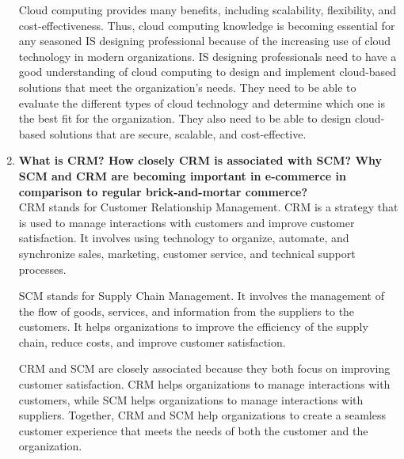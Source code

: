 \documentclass[12pt]{article}
\begin{document}
\begin{enumerate}
    Cloud computing provides many benefits, including scalability, flexibility, and cost-effectiveness. Thus, cloud computing knowledge is becoming essential for any seasoned IS designing professional because of the increasing use of cloud technology in modern organizations. IS designing professionals need to have a good understanding of cloud computing to design and implement cloud-based solutions that meet the organization's needs. They need to be able to evaluate the different types of cloud technology and determine which one is the best fit for the organization. They also need to be able to design cloud-based solutions that are secure, scalable, and cost-effective.
    \item {\bfseries What is CRM? How closely CRM is associated with SCM? Why SCM and CRM are becoming important in e-commerce in comparison to regular brick-and-mortar commerce?\\}
    CRM stands for Customer Relationship Management. CRM is a strategy that is used to manage interactions with customers and improve customer satisfaction. It involves using technology to organize, automate, and synchronize sales, marketing, customer service, and technical support processes.
    
    SCM stands for Supply Chain Management. It involves the management of the flow of goods, services, and information from the suppliers to the customers. It helps organizations to improve the efficiency of the supply chain, reduce costs, and improve customer satisfaction.
    
    CRM and SCM are closely associated because they both focus on improving customer satisfaction. CRM helps organizations to manage interactions with customers, while SCM helps organizations to manage interactions with suppliers. Together, CRM and SCM help organizations to create a seamless customer experience that meets the needs of both the customer and the organization.
    

\end{enumerate}
\end{document}
